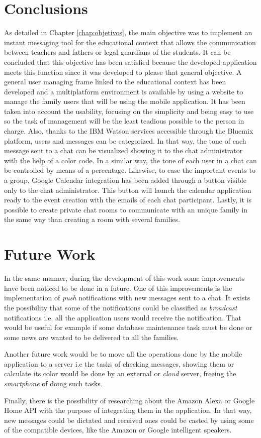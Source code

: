 \section{Conclusions}
As detailed in Chapter \ref{chap:objetivos}, the main objective was to implement an instant messaging tool for the educational context that allows the communication between teachers and fathers or \mbox{legal} guardians of the students. It can be concluded that this objective has been satisfied \mbox{because} the developed application meets this function since it was developed to please that general objective. A general user managing frame linked to the educational context has been developed and a multiplatform environment is available by using a website to manage the family users that will be using the mobile application. It has been taken into account the usability, focusing on the simplicity and being easy to use so the task of management will be the least teadious possible to the person in charge. Also, thanks to the IBM Watson services accessible through the Bluemix platform, users and messages can be categorized. In that way, the tone of each message sent to a chat can be visualized showing it to the chat administrator with the help of a color code. In a similar way, the tone of each user in a chat can be controlled by means of a percentage. Likewise, to ease the important events to a group, Google Calendar integration has been added through a button visible only to the chat administrator. This button will launch the calendar application ready to the event creation with the emails of each chat participant. Lastly, it is possible to create private chat rooms to communicate with an unique family in the same way than creating a room with several families.

\clearpage

\section{Future Work}
In the same manner, during the development of this work some improvements have been noticed to be done in a future. One of this improvements is the implementation of \textit{push} \mbox{notifications} with new messages sent to a chat. It exists the possibility that some of the notifications could be classified as \textit{broadcast} notifications i.e. all the application users would receive the notification. That would be useful for example if some database maintenance task must be done or some news are wanted to be delivered to all the families.

Another future work would be to move all the operations done by the mobile application to a server i.e the tasks of checking messages, showing them or calculate its color would be done by an external or \textit{cloud} server, freeing the \textit{smartphone} of doing such tasks.

Finally, there is the possibility of researching about the Amazon Alexa or Google Home \acs{API} with the purpose of integrating them in the application. In that way, new messages could be dictated and received ones could be casted by using some of the compatible devices, like the Amazon or Google intelligent speakers.



